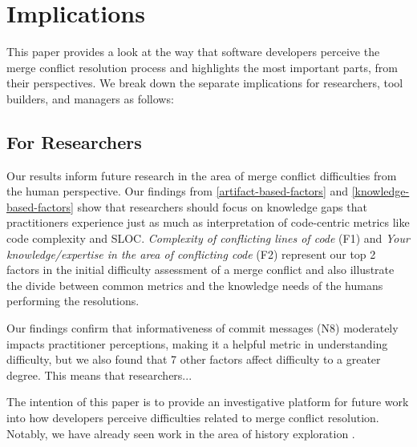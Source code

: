 \section{Implications}\label{implications}

This paper provides a look at the way that software developers perceive the merge conflict resolution process and highlights the most important parts, from their perspectives. We break down the separate implications for researchers, tool builders, and managers as follows:

\subsection{For Researchers}
Our results inform future research in the area of merge conflict difficulties from the human perspective.
Our findings from \ref{artifact-based-factors} and \ref{knowledge-based-factors} show that researchers should focus on knowledge gaps that practitioners experience just as much as interpretation of code-centric metrics like code complexity and SLOC. \textit{Complexity of conflicting lines of code} (F1) and \textit{Your knowledge/expertise in the area of conflicting code} (F2) represent our top 2 factors in the initial difficulty assessment of a merge conflict and also illustrate the divide between common metrics and the knowledge needs of the humans performing the resolutions.
 
Our findings confirm that informativeness of commit messages (N8) moderately impacts practitioner perceptions, making it a helpful metric in understanding difficulty, but we also found that 7 other factors affect difficulty to a greater degree. This means that researchers...

 
The intention of this paper is to provide an investigative platform for future work into how developers perceive difficulties related to merge conflict resolution. Notably, we have already seen work in the area of history exploration \cite{mihai_lenses}.

